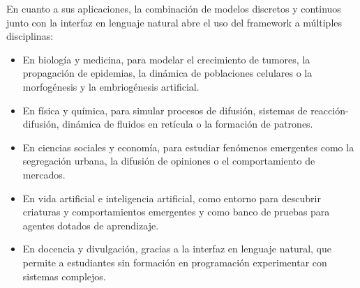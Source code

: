 \documentclass[runningheads]{llncs}
\begin{document}
En cuanto a sus aplicaciones, la combinación de modelos discretos y continuos junto con la interfaz en lenguaje natural abre el uso del framework a múltiples disciplinas:
\begin{itemize}
    \item En biología y medicina, para modelar el crecimiento de tumores, la propagación de epidemias, la dinámica de poblaciones celulares o la morfogénesis y la embriogénesis artificial.
    \item En física y química, para simular procesos de difusión, sistemas de reacción-difusión, dinámica de fluidos en retícula o la formación de patrones.
    \item En ciencias sociales y economía, para estudiar fenómenos emergentes como la segregación urbana, la difusión de opiniones o el comportamiento de mercados.
    \item En vida artificial e inteligencia artificial, como entorno para descubrir criaturas y comportamientos emergentes y como banco de pruebas para agentes dotados de aprendizaje.
    \item En docencia y divulgación, gracias a la interfaz en lenguaje natural, que permite a estudiantes sin formación en programación experimentar con sistemas complejos.
\end{itemize}
\end{document}
